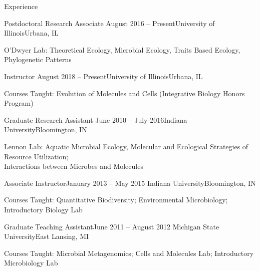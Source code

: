 \documentclass{resume} %
\begin{document}
\begin{rSection}{Experience}

    \begin{rSubsection}{Postdoctoral Research Associate}
      {August 2016 -- Present}{University of Illinois}{Urbana, IL}
      \item O'Dwyer Lab: Theoretical Ecology, Microbial Ecology, Traits Based Ecology, Phylogenetic Patterns
    \end{rSubsection}

    \begin{rSubsection}{Instructor}
      {August 2018 -- Present}{University of Illinois}{Urbana, IL}
      \item Courses Taught: Evolution of Molecules and Cells (Integrative Biology Honors Program)
    \end{rSubsection}

  \begin{rSubsection}{Graduate Research Assistant}
    {June 2010 -- July 2016}{Indiana University}{Bloomington, IN}
    \item Lennon Lab: Aquatic Microbial Ecology, Molecular and Ecological Strategies of Resource Utilization; \\
                      Interactions between Microbes and Molecules
  \end{rSubsection}

  \begin{rSubsection}{Associate Instructor}{January 2013 -- May 2015}
    {Indiana University}{Bloomington, IN}
    \item Courses Taught: Quantitative Biodiversity; Environmental Microbiology;
                          Introductory Biology Lab
  \end{rSubsection}

  \begin{rSubsection}{Graduate Teaching Assistant}{June 2011 -- August 2012}
    {Michigan State University}{East Lansing, MI}
    \item Courses Taught: Microbial Metagenomics; Cells and Molecules Lab;
                          Introductory Microbiology Lab
  \end{rSubsection}


\end{rSection}
\end{document}
